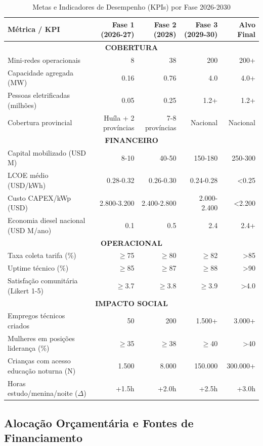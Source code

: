 \documentclass[12pt, a4paper]{article}
\begin{document}
\begin{table}[H]
\centering
\caption{Metas e Indicadores de Desempenho (KPIs) por Fase 2026-2030}
\label{tab:kpis}
\small
\begin{tabular}{|l|r|r|r|r|}
\hline
\textbf{Métrica / KPI} & \textbf{Fase 1 (2026-27)} & \textbf{Fase 2 (2028)} & \textbf{Fase 3 (2029-30)} & \textbf{Alvo Final} \\
\hline
\multicolumn{5}{|c|}{\textbf{COBERTURA}} \\
\hline
Mini-redes operacionais & 8 & 38 & 200 & 200+ \\
Capacidade agregada (MW) & 0.16 & 0.76 & 4.0 & 4.0+ \\
Pessoas eletrificadas (milhões) & 0.05 & 0.25 & 1.2+ & 1.2+ \\
Cobertura provincial & Huíla + 2 províncias & 7-8 províncias & Nacional & Nacional \\
\hline
\multicolumn{5}{|c|}{\textbf{FINANCEIRO}} \\
\hline
Capital mobilizado (USD M) & 8-10 & 40-50 & 150-180 & 250-300 \\
LCOE médio (USD/kWh) & 0.28-0.32 & 0.26-0.30 & 0.24-0.28 & <0.25 \\
Custo CAPEX/kWp (USD) & 2.800-3.200 & 2.400-2.800 & 2.000-2.400 & <2.200 \\
Economia diesel nacional (USD M/ano) & 0.1 & 0.5 & 2.4 & 2.4+ \\
\hline
\multicolumn{5}{|c|}{\textbf{OPERACIONAL}} \\
\hline
Taxa coleta tarifa (\%) & $\geq$75 & $\geq$80 & $\geq$82 & >85 \\
Uptime técnico (\%) & $\geq$85 & $\geq$87 & $\geq$88 & >90 \\
Satisfação comunitária (Likert 1-5) & $\geq$3.7 & $\geq$3.8 & $\geq$3.9 & >4.0 \\
\hline
\multicolumn{5}{|c|}{\textbf{IMPACTO SOCIAL}} \\
\hline
Empregos técnicos criados & 50 & 200 & 1.500+ & 3.000+ \\
Mulheres em posições liderança (\%) & $\geq$35 & $\geq$38 & $\geq$40 & >40 \\
Crianças com acesso educação noturna (N) & 1.500 & 8.000 & 150.000 & 300.000+ \\
Horas estudo/menina/noite ($\Delta$) & +1.5h & +2.0h & +2.5h & +3.0h \\
\hline
\end{tabular}
\end{table}

\subsection{Alocação Orçamentária e Fontes de Financiamento}
\end{document}
